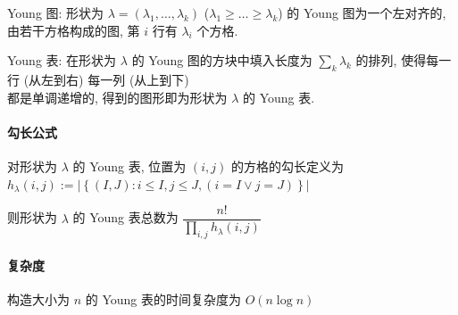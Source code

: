 Young 图: 形状为 \(\lambda=(\lambda_1,\dots,\lambda_k)\) (\(\lambda_1\geq \dots\geq \lambda_k\)) 的 Young 图为一个左对齐的, 由若干方格构成的图, 第 \(i\) 行有 \(\lambda_i\) 个方格.

Young 表: 在形状为 \(\lambda\) 的 Young 图的方块中填入长度为 \(\sum_k \lambda_k\) 的排列, 使得每一行 (从左到右) 每一列 (从上到下) \\ 都是单调递增的, 得到的图形即为形状为 \(\lambda\) 的 Young 表.

\paragraph{勾长公式}

对形状为 \(\lambda\) 的 Young 表, 位置为 \((i,j)\) 的方格的勾长定义为 \(h_{\lambda}(i,j):=\left|\left\{(I,J):i\leq I, j\leq J,(i=I \lor j=J)\right\}\right|\)

则形状为 \(\lambda\) 的 Young 表总数为 \(\dfrac{n!}{\prod_{i,j} h_{\lambda}(i,j)}\)

\paragraph{复杂度} 构造大小为 \(n\) 的 Young 表的时间复杂度为 \(O(n\log n)\)


